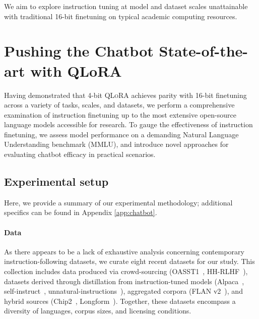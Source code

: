 We aim to explore instruction tuning at model and dataset scales unattainable with traditional 16-bit finetuning on typical academic computing resources.

\section{Pushing the Chatbot State-of-the-art with QLoRA}
\label{sec:pushing}
Having demonstrated that 4-bit \textsc{QLoRA} achieves parity with 16-bit finetuning across a variety of tasks, scales, and datasets, we perform a comprehensive examination of instruction finetuning up to the most extensive open-source language models accessible for research. To gauge the effectiveness of instruction finetuning, we assess model performance on a demanding Natural Language Understanding benchmark (MMLU), and introduce novel approaches for evaluating chatbot efficacy in practical scenarios.

\subsection{Experimental setup}
Here, we provide a summary of our experimental methodology; additional specifics can be found in Appendix \ref{app:chatbot}.

\paragraph{Data} As there appears to be a lack of exhaustive analysis concerning contemporary instruction-following datasets, we curate eight recent datasets for our study. This collection includes data produced via crowd-sourcing (OASST1~\citep{kopf2023openassistant}, HH-RLHF~\citep{bai2022training}), datasets derived through distillation from instruction-tuned models (Alpaca~\citep{alpaca}, self-instruct~\citep{wang2022self}, unnatural-instructions~\citep{honovich2022unnatural}), aggregated corpora (FLAN v2~\citep{chung2022scaling}), and hybrid sources (Chip2~\citep{laion2023}, Longform~\citep{koksal2023longform}). Together, these datasets encompass a diversity of languages, corpus sizes, and licensing conditions.

